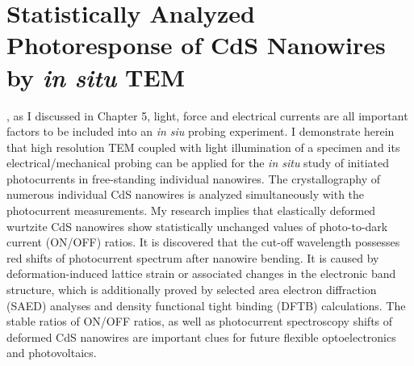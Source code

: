 

\chapter{Statistically Analyzed Photoresponse of CdS Nanowires by \emph{in situ} TEM}

, as I discussed in Chapter 5, light, force and electrical currents are all important factors to be included into an {\it in siu} probing experiment. 
I demonstrate herein that high resolution TEM coupled with light illumination of a specimen and its electrical/mechanical probing can be applied for the {\em in situ} study of initiated photocurrents in free-standing individual nanowires. 
The crystallography of numerous individual CdS nanowires is analyzed simultaneously with the photocurrent measurements. 
My research implies that elastically deformed wurtzite CdS nanowires show statistically unchanged values of photo-to-dark current (ON/OFF) ratios. 
It is discovered that the cut-off wavelength possesses red shifts of photocurrent spectrum after nanowire bending. 
It is caused by deformation-induced lattice strain or associated changes in the electronic band structure, which is additionally proved by selected area electron diffraction (SAED) analyses and density functional tight binding (DFTB) calculations. 
The stable ratios of ON/OFF ratios, as well as photocurrent spectroscopy shifts of deformed CdS nanowires are important clues for future flexible optoelectronics and photovoltaics.\\

